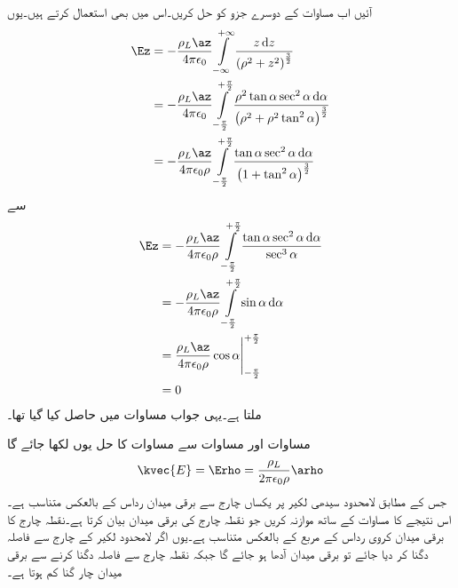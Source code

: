 آئیں اب مساوات  کے   دوسرے جزو کو حل کریں۔اس میں بھی  استعمال کرتے ہیں۔یوں
\begin{align*}
\Ez&=-\frac{\rho_L \az}{4 \pi \epsilon_0}\int\limits_{-\infty}^{+\infty} \frac{z \dif z}{\left(\rho^2+z^2 \right)^{\frac{3}{2}}}\\
&=-\frac{\rho_L \az}{4 \pi \epsilon_0}\int\limits_{-\frac{\pi}{2}}^{+\frac{\pi}{2}} \frac{\rho^2 \tan \alpha  \sec^2 \alpha \dif \alpha}{\left(\rho^2+\rho^2 \tan^2 \alpha \right)^{\frac{3}{2}}}\\
&=-\frac{\rho_L \az}{4 \pi \epsilon_0 \rho}\int\limits_{-\frac{\pi}{2}}^{+\frac{\pi}{2}} \frac{ \tan \alpha  \sec^2 \alpha \dif \alpha}{\left(1+ \tan^2 \alpha \right)^{\frac{3}{2}}}
\end{align*}
سے
\begin{gather}
\begin{aligned}\label{مساوات_کولومب_لامحدود_لکیر_عمودی_میدان}
\Ez&=-\frac{\rho_L \az}{4 \pi \epsilon_0 \rho}\int\limits_{-\frac{\pi}{2}}^{+\frac{\pi}{2}} \frac{ \tan \alpha  \sec^2 \alpha \dif \alpha}{\sec^3 \alpha}\\
&=-\frac{\rho_L \az}{4 \pi \epsilon_0 \rho}\int\limits_{-\frac{\pi}{2}}^{+\frac{\pi}{2}} \sin \alpha \dif \alpha\\
&=\frac{\rho_L \az}{4 \pi \epsilon_0 \rho} \eval{\cos \alpha}_{-\frac{\pi}{2}}^{+\frac{\pi}{2}}\\
&=0
\end{aligned}
\end{gather}
ملتا ہے۔یہی جواب مساوات  میں حاصل کیا گیا تھا۔

مساوات  اور مساوات  سے مساوات   کا حل یوں لکھا جائے گا
\begin{align}\label{مساوات_کولومب_لامحدود_لکیر_رداسی_میدان_پیدا_کرتا_ہے}
\kvec{E}=\Erho=\frac{\rho_L }{2 \pi \epsilon_0 \rho} \arho
\end{align}
جس کے مطابق لامحدود سیدھی لکیر پر یکساں چارج سے برقی میدان رداس   کے بالعکس متناسب ہے۔اس نتیجے  کا مساوات  کے ساتھ موازنہ کریں جو نقطہ چارج کی برقی میدان بیان کرتا ہے۔نقطہ چارج کا برقی میدان کروی رداس کے مربع کے بالعکس متناسب ہے۔یوں اگر لامحدود لکیر کے چارج سے فاصلہ دگنا کر دیا جائے تو برقی میدان آدھا ہو جائے گا جبکہ نقطہ چارج سے فاصلہ دگنا کرنے سے برقی میدان چار گنا کم ہوتا ہے۔

